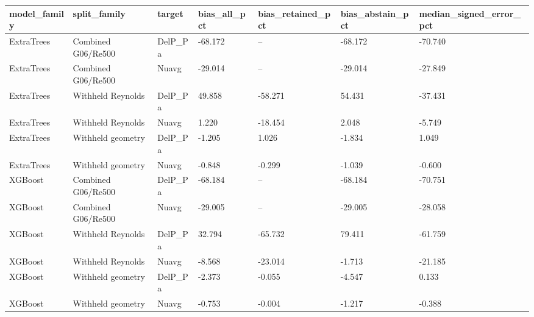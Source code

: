 \begin{tabular}{lllllll}
\hline
model_family & split_family & target & bias_all_pct & bias_retained_pct & bias_abstain_pct & median_signed_error_pct \\
\hline
ExtraTrees & Combined G06/Re500 & DelP_Pa & -68.172 & -- & -68.172 & -70.740 \\
ExtraTrees & Combined G06/Re500 & Nuavg & -29.014 & -- & -29.014 & -27.849 \\
ExtraTrees & Withheld Reynolds & DelP_Pa & 49.858 & -58.271 & 54.431 & -37.431 \\
ExtraTrees & Withheld Reynolds & Nuavg & 1.220 & -18.454 & 2.048 & -5.749 \\
ExtraTrees & Withheld geometry & DelP_Pa & -1.205 & 1.026 & -1.834 & 1.049 \\
ExtraTrees & Withheld geometry & Nuavg & -0.848 & -0.299 & -1.039 & -0.600 \\
XGBoost & Combined G06/Re500 & DelP_Pa & -68.184 & -- & -68.184 & -70.751 \\
XGBoost & Combined G06/Re500 & Nuavg & -29.005 & -- & -29.005 & -28.058 \\
XGBoost & Withheld Reynolds & DelP_Pa & 32.794 & -65.732 & 79.411 & -61.759 \\
XGBoost & Withheld Reynolds & Nuavg & -8.568 & -23.014 & -1.713 & -21.185 \\
XGBoost & Withheld geometry & DelP_Pa & -2.373 & -0.055 & -4.547 & 0.133 \\
XGBoost & Withheld geometry & Nuavg & -0.753 & -0.004 & -1.217 & -0.388 \\
\hline
\end{tabular}

